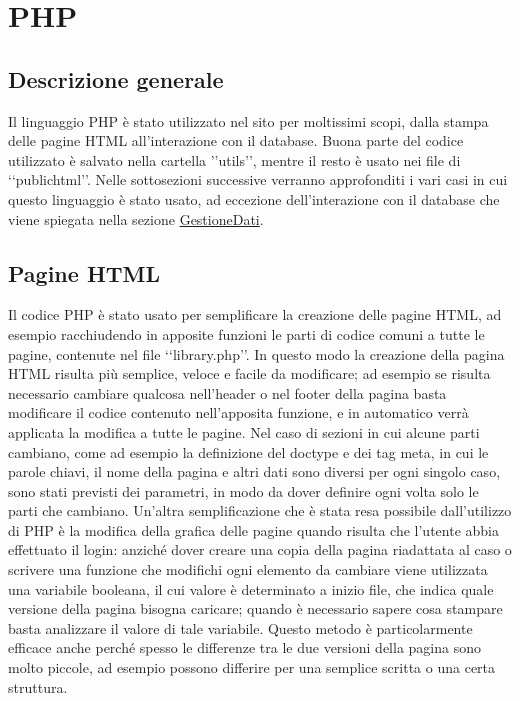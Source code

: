 \section{PHP}{
	\subsection{Descrizione generale}{
		Il linguaggio PHP è stato utilizzato nel sito per moltissimi scopi, dalla stampa delle pagine HTML all'interazione con il database. Buona parte del codice utilizzato è salvato nella cartella ’’utils’’, mentre il resto è usato nei file di ‘‘public\textunderscore html’’. Nelle sottosezioni successive verranno approfonditi i vari casi in cui questo linguaggio è stato usato, ad eccezione dell'interazione con il database che viene spiegata nella sezione \hyperref[sec:PHPDB]{GestioneDati}.
	}
	\subsection{Pagine HTML}{
		Il codice PHP è stato usato per semplificare la creazione delle pagine HTML, ad esempio racchiudendo in apposite funzioni le parti di codice comuni a tutte le pagine, contenute nel file ‘‘library.php’’. In questo modo la creazione della pagina HTML risulta più semplice, veloce e facile da modificare; ad esempio se risulta necessario cambiare qualcosa nell'header o nel footer della pagina basta modificare il codice contenuto nell'apposita funzione, e in automatico verrà applicata la modifica a tutte le pagine. Nel caso di sezioni in cui alcune parti cambiano, come ad esempio la definizione del doctype e dei tag meta, in cui le parole chiavi, il nome della pagina e altri dati sono diversi per ogni singolo caso, sono stati previsti dei parametri, in modo da dover definire ogni volta solo le parti che cambiano.
		Un'altra semplificazione che è stata resa possibile dall'utilizzo di PHP è la modifica della grafica delle pagine quando risulta che l'utente abbia effettuato il login: anziché dover creare una copia della pagina riadattata al caso o scrivere una funzione che modifichi ogni elemento da cambiare viene utilizzata una variabile booleana, il cui valore è determinato a inizio file, che indica quale versione della pagina bisogna caricare; quando è necessario sapere cosa stampare basta analizzare il valore di tale variabile. Questo metodo è particolarmente efficace anche perché spesso le differenze tra le due versioni della pagina sono molto piccole, ad esempio possono differire per una semplice scritta o una certa struttura.
	}
}
